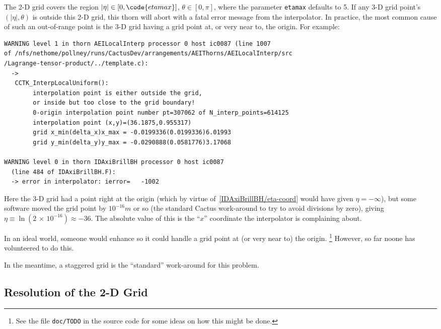 \documentclass{article}
\begin{document}
The 2-D grid covers the region $|\eta| \in [0,\code{etamax}]$,
$\theta \in [0,\pi]$, where the parameter \verb|etamax| defaults to 5.
If any 3-D grid point's $(|\eta|,\theta)$ is outside this 2-D grid,
this thorn will abort with a fatal error message from the interpolator.
In practice, the most common cause of such an out-of-range point is
the 3-D grid having a grid point at, or very near to, the origin.
For example:
\begin{verbatim}
WARNING level 1 in thorn AEILocalInterp processor 0 host ic0087 (line 1007
of /nfs/nethome/pollney/runs/CactusDev/arrangements/AEIThorns/AEILocalInterp/src
/Lagrange-tensor-product/../template.c):
  ->
   CCTK_InterpLocalUniform():
        interpolation point is either outside the grid,
        or inside but too close to the grid boundary!
        0-origin interpolation point number pt=307062 of N_interp_points=614125
        interpolation point (x,y)=(36.1875,0.955317)
        grid x_min(delta_x)x_max = -0.0199336(0.0199336)6.01993
        grid y_min(delta_y)y_max = -0.0290888(0.0581776)3.17068

WARNING level 0 in thorn IDAxiBrillBH processor 0 host ic0087
  (line 484 of IDAxiBrillBH.F):
  -> error in interpolator: ierror=   -1002
\end{verbatim}

Here the 3-D grid had a point right at the origin
(which by virtue of~\eqref{IDAxiBrillBH/eta-coord} would have given
$\eta = -\infty$), but some software moved the grid point by $10^{-16}m$
or so (the standard Cactus work-around to try to avoid divisions by zero),
giving $\eta \equiv \ln (2 \,{\times}\, 10^{-16}) \approx -36$.
The absolute value of this is the ``$x$'' coordinate the
interpolator is complaining about.

In an ideal world, someone would enhance  so it
could handle a grid point at (or very near to) the origin.%
\footnote{%
	 See the file \texttt{doc/TODO} in the 
	 source code for some ideas on how this might be done.
	 }%
{}  However, so far noone has volunteered to do this.

In the meantime, a staggered grid is the ``standard'' work-around
for this problem.


\subsection{Resolution of the 2-D Grid}
\end{document}
